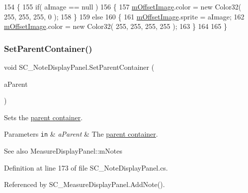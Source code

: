 \begin{DoxyCode}
154     \{
155         \textcolor{keywordflow}{if}( aImage == null )
156         \{
157             \hyperlink{group___s_c___n_d_p_priv_var_ga177d14cf2cac316a0bfc2e1096256a0c}{mOffsetImage}.color = \textcolor{keyword}{new} Color32( 255, 255, 255, 0 );
158         \}
159         \textcolor{keywordflow}{else}
160         \{
161             \hyperlink{group___s_c___n_d_p_priv_var_ga177d14cf2cac316a0bfc2e1096256a0c}{mOffsetImage}.sprite = aImage;
162             \hyperlink{group___s_c___n_d_p_priv_var_ga177d14cf2cac316a0bfc2e1096256a0c}{mOffsetImage}.color = \textcolor{keyword}{new} Color32( 255, 255, 255, 255 );
163         \}
164 
165     \}
\end{DoxyCode}
\mbox{\label{group___s_c___n_d_p_unity_gae642b50484b9c7fb2bd3b201aeef726c}} 
\subsubsection{\texorpdfstring{Set\+Parent\+Container()}{SetParentContainer()}}
{\footnotesize\ttfamily void S\+C\+\_\+\+Note\+Display\+Panel.\+Set\+Parent\+Container (\begin{DoxyParamCaption}\item[{\hyperlink{class_s_c___measure_display_panel}{S\+C\+\_\+\+Measure\+Display\+Panel}}]{a\+Parent }\end{DoxyParamCaption})}



Sets the \hyperlink{group___doc_s_c___m_d_p}{parent container}. 


\begin{DoxyParams}[1]{Parameters}
\mbox{\tt in}  & {\em a\+Parent} & The \hyperlink{group___doc_s_c___m_d_p}{parent container}.\\
\hline
\end{DoxyParams}
\begin{DoxySeeAlso}{See also}
Measure\+Display\+Panel\+::m\+Notes 
\end{DoxySeeAlso}


Definition at line 173 of file S\+C\+\_\+\+Note\+Display\+Panel.\+cs.



Referenced by S\+C\+\_\+\+Measure\+Display\+Panel.\+Add\+Note().



